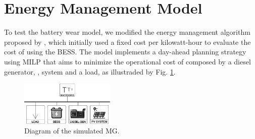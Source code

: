 \documentclass{ieeeaccess}
\begin{document}
%
%

    \section{Energy Management Model}
    To test the battery wear model, we modified the energy management algorithm proposed by \cite{SANTOS2018}, which initially used a fixed cost per kilowatt-hour to evaluate the cost of using the \ac{BESS}. The model implements a day-ahead planning strategy using \ac{MILP} that aims to minimize the operational cost of  composed by a diesel generator, ,  system and a load, as illustraded by Fig. \ref{fig:mg1}.
    \begin{figure}[htbp]
        \centering
        \includegraphics[width=0.4\textwidth]{figures/mg2.png}
        \caption{Diagram of the simulated \ac{MG}.}
        \label{fig:mg1}
    \end{figure}
\end{document}
